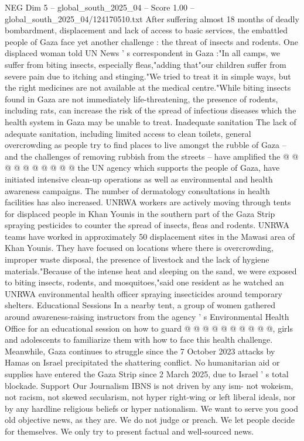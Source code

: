\begin{textsample}{NEG Dim 5 – global\_south\_2025\_04 – Score 1.00 – global\_south\_2025\_04/124170510.txt}  \label{ex:f5_neg_365}
After suffering almost 18 months of deadly bombardment, displacement and lack of access to basic services, the embattled people of Gaza face yet another challenge : the threat of insects and rodents.
One displaced woman told UN News ' s correspondent in Gaza :"In all camps, we suffer from biting insects, especially fleas,"adding that"our children suffer from severe pain due to itching and stinging."We tried to treat it in simple ways, but the right medicines are not available at the medical centre."While biting insects found in Gaza are not immediately life-threatening, the presence of rodents, including rats, can increase the risk of the spread of infectious diseases which the health system in Gaza may be unable to treat.
Inadequate sanitation The lack of adequate sanitation, including limited access to clean toilets, general overcrowding as people try to find places to live amongst the rubble of Gaza -- and the challenges of removing rubbish from the streets -- have amplified the @ @ @ @ @ @ @ @ @ @ the UN agency which supports the people of Gaza, have initiated intensive clean-up operations as well as environmental and health awareness campaigns.
The number of dermatology consultations in health facilities has also increased.
UNRWA workers are actively moving through tents for displaced people in Khan Younis in the southern part of the Gaza Strip spraying pesticides to counter the spread of insects, fleas and rodents.
UNRWA teams have worked in approximately 50 displacement sites in the Mawasi area of Khan Younis.
They have focused on locations where there is overcrowding, improper waste disposal, the presence of livestock and the lack of hygiene materials."Because of the intense heat and sleeping on the sand, we were exposed to biting insects, rodents, and mosquitoes,"said one resident as he watched an UNRWA environmental health officer spraying insecticides around temporary shelters.
Educational Sessions In a nearby tent, a group of women gathered around awareness-raising instructors from the agency ' s Environmental Health Office for an educational session on how to guard @ @ @ @ @ @ @ @ @ @, girls and adolescents to familiarize them with how to face this health challenge.
Meanwhile, Gaza continues to struggle since the 7 October 2023 attacks by Hamas on Israel precipitated the shattering conflict.
No humanitarian aid or supplies have entered the Gaza Strip since 2 March 2025, due to Israel ' s total blockade.
Support Our Journalism IBNS is not driven by any ism- not wokeism, not racism, not skewed secularism, not hyper right-wing or left liberal ideals, nor by any hardline religious beliefs or hyper nationalism.
We want to serve you good old objective news, as they are.
We do not judge or preach.
We let people decide for themselves.
We only try to present factual and well-sourced news.

\end{textsample}
